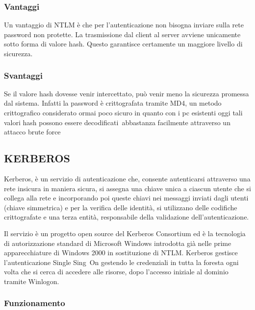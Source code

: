 \documentclass[
]{article}
\begin{document}
\subsubsection{\texorpdfstring{{Vantaggi}}{Vantaggi}}\label{h.cqzcwpdg5pjn}

{Un vantaggio di NTLM è che per l'autenticazione non bisogna inviare
sulla rete password non protette. La trasmissione dal client al server
avviene unicamente sotto forma di valore hash. Questo garantisce
certamente un maggiore livello di sicurezza.}

\subsubsection{\texorpdfstring{{Svantaggi}}{Svantaggi}}\label{h.uysbcrecuf65}

{Se il valore hash dovesse venir intercettato, può venir meno la
sicurezza promessa dal sistema. Infatti la password è crittografata
tramite MD4, un metodo crittografico considerato ormai poco sicuro in
quanto con i pc esistenti oggi tali valori hash possono essere
}{decodificati}{~abbastanza facilmente attraverso un attacco brute
force}

\subsection{\texorpdfstring{{KERBEROS}}{KERBEROS}}\label{h.9kd4k9ac59hc}

{Kerberos, è un servizio di autenticazione che, consente autenticarsi
attraverso una rete insicura in maniera sicura, si assegna una chiave
unica a ciascun utente che si collega alla rete e incorporando poi
queste chiavi nei messaggi inviati dagli utenti (chiave simmetrica) e
per la verifica delle identità, si utilizzano delle codifiche
crittografate e una terza entità, responsabile della validazione
dell'autenticazione. }

{}

{Il servizio è un progetto open source del Kerberos Consortium ed è la
tecnologia di autorizzazione standard di Microsoft Windows introdotta
già nelle prime apparecchiature di Windows 2000 in sostituzione di NTLM.
Kerberos gestisce l'autenticazione Single }{Sing}{~On gestendo le
credenziali in tutta la foresta ogni volta che si cerca di accedere alle
risorse, dopo l'accesso iniziale al dominio tramite Winlogon.}

\subsubsection{\texorpdfstring{{Funzionamento}}{Funzionamento}}\label{h.bvnu1qjltmau}
\end{document}
